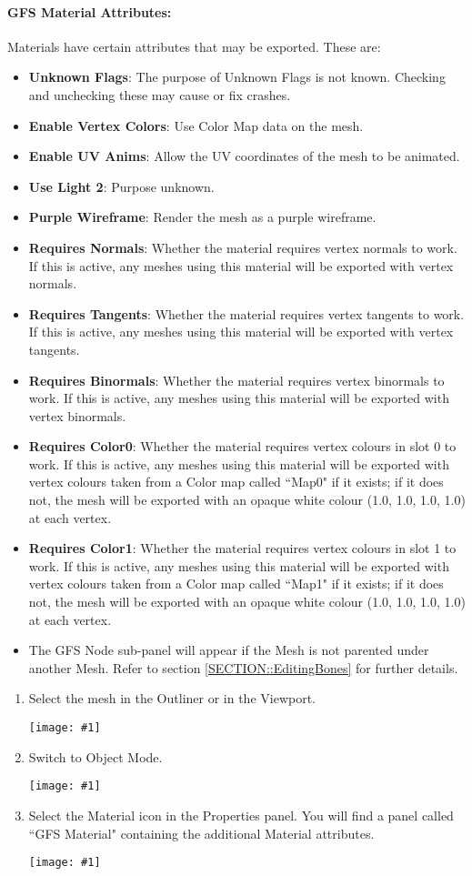 \documentclass{article}
\newenvironment{guide}[1]
{
	\begin{center}
		\begin{tcolorbox}[%
			colback=black!20, 
			boxrule=0pt, 
			title=Step-by-step: #1,
			enhanced,
			breakable,
			overlay unbroken={%
                \draw[line width=1pt, black, rounded corners]
        	    (frame.north west) rectangle (frame.south east);
			},
    		overlay first={%
        		 \draw[line width=1pt, black, rounded corners]
        	    (frame.south west) -- (frame.north west) -- (frame.north east) -- (frame.south east);
                \draw[line width=1pt, black]
                (frame.south west) -- (frame.south east);
            },
    		overlay middle={%
                \draw[line width=1pt, black]
        	    (frame.north west) rectangle (frame.south east);
        	},
    		overlay last={%
                \draw[line width=1pt, black, rounded corners]
        	    (frame.north west) -- (frame.south west) -- (frame.south east) -- (frame.north east);
                \draw[line width=1pt, black]
                (frame.north west) -- (frame.north east);
           	}
        ]{}
    	\begin{enumerate}
}
{
    		\end{enumerate}
    	\end{tcolorbox}
	\end{center}  	 
}
\newcommand{\guideimage}[1]
{
	\begin{center}
		\texttt{[image: \#1]}
	\end{center}
}
\begin{document}
\paragraph{GFS Material Attributes:}
\noindent Materials have certain attributes that may be exported. These are:
\begin{itemize}
\item \textbf{Unknown Flags}: The purpose of Unknown Flags is not known. Checking and unchecking these may cause or fix crashes.
\item \textbf{Enable Vertex Colors}: Use Color Map data on the mesh.
\item \textbf{Enable UV Anims}: Allow the UV coordinates of the mesh to be animated.
\item \textbf{Use Light 2}: Purpose unknown.
\item \textbf{Purple Wireframe}: Render the mesh as a purple wireframe.
\item \textbf{Requires Normals}: Whether the material requires vertex normals to work. If this is active, any meshes using this material will be exported with vertex normals.
\item \textbf{Requires Tangents}: Whether the material requires vertex tangents to work. If this is active, any meshes using this material will be exported with vertex tangents.
\item \textbf{Requires Binormals}: Whether the material requires vertex binormals to work. If this is active, any meshes using this material will be exported with vertex binormals.
\item \textbf{Requires Color0}: Whether the material requires vertex colours in slot 0 to work. If this is active, any meshes using this material will be exported with vertex colours taken from a Color map called ``Map0" if it exists; if it does not, the mesh will be exported with an opaque white colour (1.0, 1.0, 1.0, 1.0) at each vertex.
\item \textbf{Requires Color1}: Whether the material requires vertex colours in slot 1 to work. If this is active, any meshes using this material will be exported with vertex colours taken from a Color map called ``Map1" if it exists; if it does not, the mesh will be exported with an opaque white colour (1.0, 1.0, 1.0, 1.0) at each vertex.
\item The GFS Node sub-panel will appear if the Mesh is not parented under another Mesh. Refer to section \ref{SECTION::EditingBones} for further details.
\end{itemize}
\begin{guide}{Accessing Extra Material Attributes}
\item Select the mesh in the Outliner or in the Viewport.
\guideimage{images/editing_models/edits_select_mesh.png}
\item Switch to Object Mode.
\guideimage{images/editing_models/edits_to_object_mode.png}
\item Select the Material icon in the Properties panel. You will find a panel called ``GFS Material" containing the additional Material attributes.
\guideimage{images/editing_models/edits_material_properties.png}
\end{guide}
\end{document}
